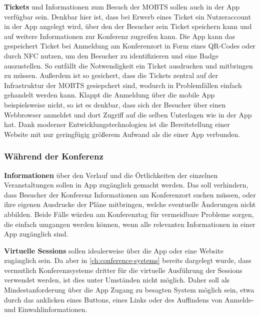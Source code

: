 \textbf{Tickets} und Informationen zum Besuch der \ac{MOBTS} sollen auch in der App verfügbar sein.
Denkbar hier ist, dass bei Erwerb eines Ticket ein Nutzeraccount in der App angelegt wird, über den der Besucher sein Ticket speichern kann und auf weitere Informationen zur Konferenz zugreifen kann.
Die App kann das gespeichert Ticket bei Anmeldung am Konferenzort in Form eines QR-Codes oder durch \ac{NFC} nutzen, um den Besucher zu identifizieren und eine Badge auszustellen.
So entfällt die Notwendigkeit ein Ticket ausdrucken und mitbringen zu müssen.
Außerdem ist so gesichert, dass die Tickets zentral auf der Infrastruktur der MOBTS gesiepchert sind, wodurch in Problemfällen einfach gehandelt werden kann.
Klappt die Anmeldung über die mobile App beispielsweise nicht, so ist es denkbar, dass sich der Besucher über einen Webbrowser anmeldet und dort Zugriff auf die selben Unterlagen wie in der App hat.
Dank moderner Entwicklungstechnologien ist die Bereitstellung einer Website mit nur geringfügig größerem Aufwand als die einer App verbunden.

\subsubsection*{Während der Konferenz}
\textbf{Informationen} über den Verlauf und die Örtlichkeiten der einzelnen Veranstaltungen sollen in App zugänglich gemacht werden.
Das soll verhindern, dass Besucher der Konferenz Informationen am Konferenzort suchen müssen, oder ihre eigenen Ausdrucke der Pläne mitbringen, welche eventuelle Änderungen nicht abbilden.
Beide Fälle würden am Konferenztag für vermeidbare Probleme sorgen, die einfach umgangen werden können, wenn alle relevanten Informationen in einer App zugänglich sind.

\textbf{Virtuelle Sessions} sollen idealerweise über die App oder eine Website zugänglich sein. 
Da aber in \autoref{ch:conference-systems} bereits dargelegt wurde, dass vermutlich Konferenzsysteme dritter für die virtuelle Ausführung der Sessions verwendet werden, ist dies unter Umständen nicht möglich.
Daher soll als Mindestanforderung über die App Zugang zu besagten System möglich sein, etwa durch das anklicken eines Buttons, eines Links oder des Auffindens von Anmelde- und Einwahlinformationen.

